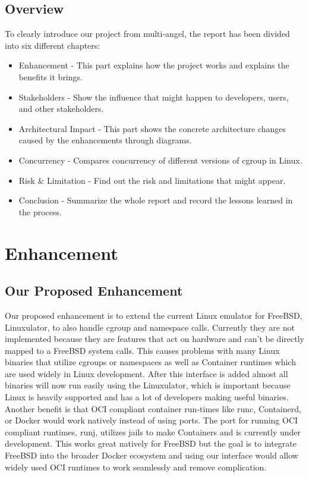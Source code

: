 \documentclass[12pt, dvipsnames, a4paper]{article}
\begin{document}
\subsection{Overview}

To clearly introduce our project from multi-angel, the report has been divided into six different chapters:
\begin{itemize}
	\item Enhancement - This part explains how the project works and explains the benefits it brings.
	\item Stakeholders - Show the influence that might happen to developers, users, and other stakeholders.
	\item Architectural Impact - This part shows the concrete architecture changes caused by the enhancements through diagrams.
	\item Concurrency - Compares concurrency of different versions of cgroup in Linux.
	\item Risk \& Limitation - Find out the risk and limitations that might appear.
	\item Conclusion - Summarize the whole report and record the lessons learned in the process.
\end{itemize}
\clearpage


\section{Enhancement}
\subsection{Our Proposed Enhancement}
Our proposed enhancement is to extend the current Linux emulator for FreeBSD, Linuxulator, to also handle cgroup and namespace calls. Currently they are not implemented because they are features that act on hardware and can’t be directly mapped to a FreeBSD system calls. This causes problems with many Linux binaries that utilize cgroups or namespaces as well as Container runtimes which are used widely in Linux development. After this interface is added almost all binaries will now run easily using the Linuxulator, which is important because Linux is heavily supported and has a lot of developers making useful binaries. Another benefit is that OCI compliant container run-times like runc, Containerd, or Docker would work natively instead of using ports. The port for running OCI compliant runtimes, runj, utilizes jails to make Containers and is currently under development. This works great natively for FreeBSD but the goal is to integrate FreeBSD into the broader Docker ecosystem and using our interface would allow widely used OCI runtimes to work seamlessly and remove complication.
\end{document}
